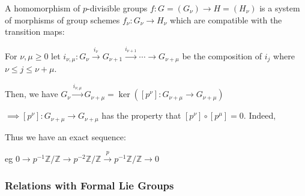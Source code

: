 \documentclass{article}
\theoremstyle{definition}
\numberwithin{theorem}{subsection}
\begin{document}
    A homomorphism of \(p\)-divisible groups \(f: G = (G_\nu) \to H = (H_\nu)\) is a system of morphisms of group schemes \(f_\nu: G_\nu \to H_\nu\) which are compatible with the transition maps:

    \begin{center}
    \end{center}

    For \(\nu,\mu \geq 0\) let \(i_{\nu,\mu}:G_{\nu} \xrightarrow{i_\nu} G_{\nu+1} \xrightarrow{i_{\nu+1}} \cdots \to G_{\nu+\mu}\) be the composition of \(i_j\) where \(\nu\leq j\leq \nu +\mu\).

    Then, we have \(G_\nu \xrightarrow{i_{\nu,\mu}} G_{\nu+\mu} = \ker \left( [p^\nu]: G_{\nu+\mu} \to G_{\nu+\mu} \right) \) 

    \(\implies [p^\nu]: G_{\nu+\mu} \to G_{\nu+\mu}\) has the property that \([p^\nu] \circ [p^\mu] = 0\). Indeed,
    
    \begin{center}
    \end{center}

    Thus we have an exact sequence:

    \begin{center}
    \end{center}

    eg \(0 \to p ^{-1} \mathbb{Z} / \mathbb{Z} \to p ^{-2} \mathbb{Z} / \mathbb{Z} \xrightarrow{p} p ^{-1} \mathbb{Z} / \mathbb{Z} \to 0\) 

    \subsubsection{Relations with Formal Lie Groups}
\end{document}
